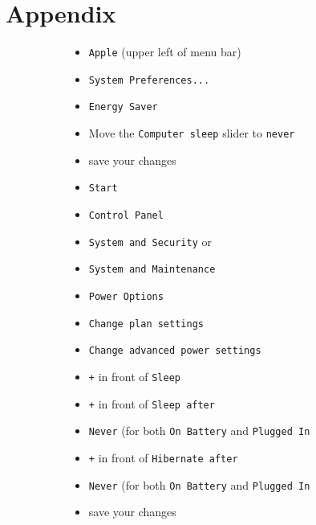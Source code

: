 \documentclass{scrartcl}
\begin{document}
\newpage
\section{Appendix}

\setcounter{figure}{0}    

\renewcommand{\figurename}{Listing}

\begin{figure}[h]
\caption{Configuring A Computer to Avoid Autosleep}
\begin{subfigure}[t]{0.5\textwidth}
\begin{itemize}
\item \texttt{Apple} (upper left of menu bar)
\item \texttt{System Preferences...}
\item \texttt{Energy Saver}
\item Move the \texttt{Computer sleep} slider to \texttt{never}
\item save your changes
\end{itemize}
\end{subfigure}%
\hfill
\begin{subfigure}[t]{0.5\textwidth}
\begin{itemize}
\item \texttt{Start}
\item \texttt{Control Panel}
\item \texttt{System and Security} or 
\item \texttt{System and Maintenance}
\item \texttt{Power Options}
\item \texttt{Change plan settings}
\item \texttt{Change advanced power settings}
\item \texttt{+} in front of \texttt{Sleep}
\item \texttt{+} in front of \texttt{Sleep after}
\item \texttt{Never} (for both \texttt{On Battery} and \texttt{Plugged In}
\item \texttt{+} in front of \texttt{Hibernate after}
\item \texttt{Never} (for both \texttt{On Battery} and \texttt{Plugged In}
\item save your changes
\end{itemize}
\end{subfigure}
\label{fig:auto_sleep}
\addtocounter{figure}{-1} 
\end{figure}
\end{document}
